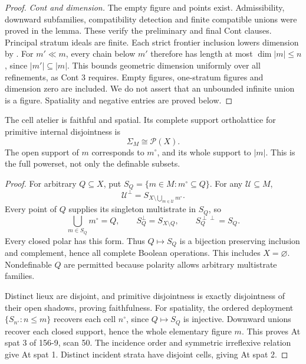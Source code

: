 \begin{proof}
\emph{Cont and dimension.}
The empty figure and points exist.
Admissibility, downward subfamilies,
compatibility detection and finite
compatible unions were proved in
the lemma. These verify the
preliminary and final Cont clauses.
Principal stratum ideals are finite.
Each strict frontier inclusion
lowers dimension by
\citet[Theorem 3.22]{Coste1999}.
For \(m'\ll m\), every chain
below \(m'\) therefore has length
at most \(\dim|m|\leq n\), since
\(|m'|\subseteq|m|\). This bounds
geometric dimension uniformly over
all refinements, as Cont 3 requires.
Empty figures, one-stratum figures
and dimension zero are included.
We do not assert that an unbounded
infinite union is a figure.
Spatiality and negative entries
are proved below.
\end{proof}


\begin{theorem}\label{SA21-BM-cell-support}
The cell atelier is faithful and spatial. Its complete
support ortholattice for primitive internal disjointness is
\[
 \Sigma_M\cong\mathcal P(X).
\]
The open support of \(m\) corresponds to \(m^\circ\),
and its whole support to \(|m|\). This is the full
powerset, not only the definable subsets.
\end{theorem}

\begin{proof}
For arbitrary \(Q\subseteq X\), put
\(S_Q=\{m\in M:m^\circ\subseteq Q\}\).
For any \(\mathcal U\subseteq M\),
\[
 \mathcal U^\perp
 =S_{X\setminus\bigcup_{m\in\mathcal U}m^\circ}.
\]
Every point of \(Q\) supplies its singleton
multistrate in \(S_Q\), so
\[
 \bigcup_{m\in S_Q}m^\circ=Q,\qquad
 S_Q^\perp=S_{X\setminus Q},\qquad
 S_Q^{\perp\perp}=S_Q.
\]
Every closed polar has this form.
Thus \(Q\mapsto S_Q\) is a bijection
preserving inclusion and complement,
hence all complete Boolean operations.
This includes \(X=\varnothing\).
Nondefinable \(Q\) are permitted because
polarity allows arbitrary multistrate
families.

Distinct lieux are disjoint, and
primitive disjointness is exactly
disjointness of their open shadows,
proving faithfulness.
For spatiality, the ordered deployment
\(\{S_{n^\circ}:n\leq m\}\)
recovers each cell \(n^\circ\), since
\(Q\mapsto S_Q\) is injective.
Downward unions recover each closed
support, hence the whole elementary
figure \(m\). This proves
At spat 3 of 156-9, scan 50.
The incidence order and symmetric
irreflexive relation give At spat 1.
Distinct incident strata have
disjoint cells, giving At spat 2.
\end{proof}

